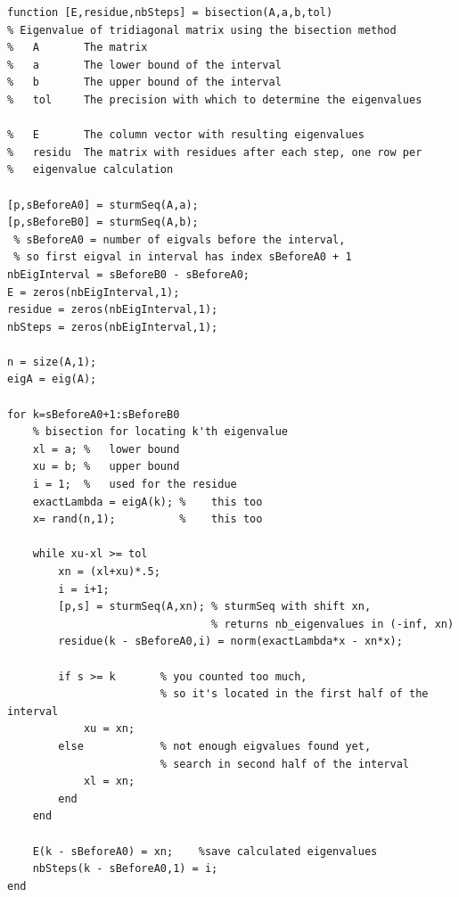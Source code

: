\documentclass[]{article}
\begin{document}
\begin{framed}
\begin{lstlisting}
function [E,residue,nbSteps] = bisection(A,a,b,tol)
% Eigenvalue of tridiagonal matrix using the bisection method
%   A       The matrix 
%   a       The lower bound of the interval
%   b       The upper bound of the interval
%   tol     The precision with which to determine the eigenvalues

%   E       The column vector with resulting eigenvalues
%   residu  The matrix with residues after each step, one row per
%   eigenvalue calculation

[p,sBeforeA0] = sturmSeq(A,a);
[p,sBeforeB0] = sturmSeq(A,b); 
 % sBeforeA0 = number of eigvals before the interval, 
 % so first eigval in interval has index sBeforeA0 + 1
nbEigInterval = sBeforeB0 - sBeforeA0;
E = zeros(nbEigInterval,1);
residue = zeros(nbEigInterval,1);
nbSteps = zeros(nbEigInterval,1);

n = size(A,1);
eigA = eig(A);

for k=sBeforeA0+1:sBeforeB0
    % bisection for locating k'th eigenvalue
    xl = a; %   lower bound
    xu = b; %   upper bound
    i = 1;  %   used for the residue
    exactLambda = eigA(k); %    this too
    x= rand(n,1);          %    this too
    
    while xu-xl >= tol
        xn = (xl+xu)*.5;
        i = i+1;
        [p,s] = sturmSeq(A,xn); % sturmSeq with shift xn, 
        						% returns nb_eigenvalues in (-inf, xn)
        residue(k - sBeforeA0,i) = norm(exactLambda*x - xn*x);
        
        if s >= k       % you counted too much, 
        				% so it's located in the first half of the interval
            xu = xn;
        else            % not enough eigvalues found yet, 
        				% search in second half of the interval
            xl = xn;
        end
    end
    
    E(k - sBeforeA0) = xn;    %save calculated eigenvalues
    nbSteps(k - sBeforeA0,1) = i;
end
\end{lstlisting}
\label{matlabBisection}
\end{framed}
\end{document}
